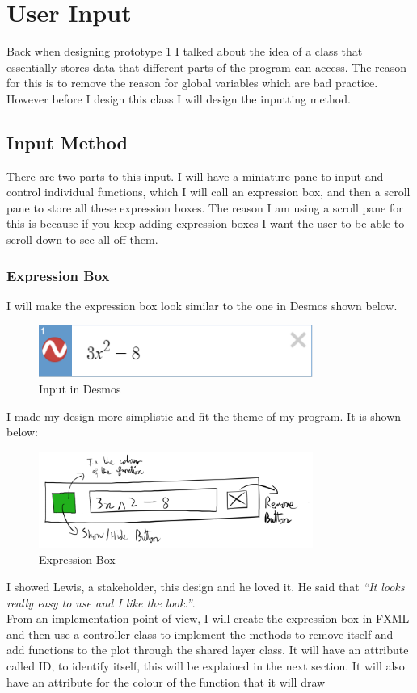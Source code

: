 \documentclass[../../../../main.tex]{subfiles}
\begin{document}
\section{User Input}
Back when designing prototype 1 I talked about the idea of a class that essentially stores data that different parts of the program can access. The reason for this is to remove the reason for global variables which are bad practice. However before I design this class I will design the inputting method.
\subsection{Input Method}
There are two parts to this input. I will have a miniature pane to input and control individual functions, which I will call an expression box, and then a scroll pane to store all these expression boxes. The reason I am using a scroll pane for this is because if you keep adding expression boxes I want the user to be able to scroll down to see all off them.
\subsubsection{Expression Box}
I will make the expression box look similar to the one in Desmos shown below.
\begin{figure}[H]
	\centering
	\includegraphics[width=0.8\textwidth]{images/desmos}
	\caption{Input in Desmos}
\end{figure}
I made my design more simplistic and fit the theme of my program. It is shown below:
\begin{figure}[H]
	\centering
	\includegraphics[width=0.8\textwidth]{images/expressionBox}
	\caption{Expression Box}
\end{figure}
I showed Lewis, a stakeholder, this design and he loved it. He said that \textit{``It looks really easy to use and I like the look.''}.\\
From an implementation point of view, I will create the expression box in FXML and then use a controller class to implement the methods to remove itself and add functions to the plot through the shared layer class. It will have an attribute called ID, to identify itself, this will be explained in the next section. It will also have an attribute for the colour of the function that it will draw
\newpage
\end{document}
